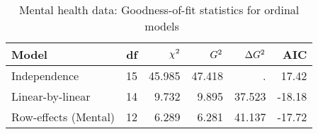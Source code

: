 \begin{table}[htb]
 \caption{Mental health data: Goodness-of-fit statistics for ordinal \loglin\ models}\label{tab:mentab2}
 \begin{center}
 \begin{tabular}{l rrrr r}
  \hline
  Model                & df & $\chi^2$ & $G^2$ & $\Delta G^2$  & AIC \\ 
  \hline
  Independence         & 15 & 45.985 & 47.418 & .    &  17.42\\ 
  Linear-by-linear     & 14 & 9.732 & 9.895 & 37.523 & -18.18\\ 
  Row-effects (Mental) & 12 & 6.289 & 6.281 & 41.137 & -17.72\\ 
  \hline
 \end{tabular}
 \end{center}
\end{table}

